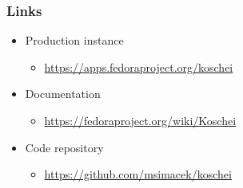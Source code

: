 \documentclass[pdftex,unicode,xcolor=table]{beamer}
\begin{document}
\begin{frame}
  \frametitle{Links}
  \begin{itemize}
    \item Production instance
    \begin{itemize}
      \item \url{https://apps.fedoraproject.org/koschei}
    \end{itemize}
    \item Documentation
    \begin{itemize}
      \item \url{https://fedoraproject.org/wiki/Koschei}
    \end{itemize}
    \item Code repository
    \begin{itemize}
      \item \url{https://github.com/msimacek/koschei}
    \end{itemize}
  \end{itemize}
\end{frame}




 {
  \Rhbg{\frame{\theend}}
}
\end{document}
